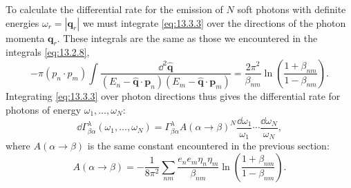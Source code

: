 To calculate the differential rate for the emission of $N$ soft photons with
definite energies $\omega_r=|\mathbf q_r|$ we must integrate
\eqref{eq:13.3.3} over the directions of the photon momenta $\mathbf q_r$.
These integrals are the same as those we encountered in the integrals
\eqref{eq:13.2.8},
\begin{equation}
-\pi(p_n\cdot p_m)\int
\frac{\dd^2\hat{\mathbf q}}
{(E_n-\hat{\mathbf q}\cdot\mathbf p_n)
 (E_m-\hat{\mathbf q}\cdot\mathbf p_m)}
=\frac{2\pi^2}{\beta_{nm}}
\ln\left(\frac{1+\beta_{nm}}{1-\beta_{nm}}\right).
\tag{13.3.4}\label{eq:13.3.4}
\end{equation}
Integrating \eqref{eq:13.3.3} over photon directions thus gives the
differential rate for photons of energy $\omega_1,\ldots,\omega_N$:
\begin{equation}
\dd\Gamma^\lambda_{\beta\alpha}(\omega_1,\ldots,\omega_N)
=\Gamma^\lambda_{\beta\alpha}A(\alpha\to\beta)^N
\frac{\dd\omega_1}{\omega_1}\cdots\frac{\dd\omega_N}{\omega_N},
\tag{13.3.5}\label{eq:13.3.5}
\end{equation}
where $A(\alpha\to\beta)$ is the same constant encountered in the previous
section:
\[
A(\alpha\to\beta)=-\frac{1}{8\pi^2}\sum_{nm}
\frac{e_ne_m\eta_n\eta_m}{\beta_{nm}}
\ln\left(\frac{1+\beta_{nm}}{1-\beta_{nm}}\right).
\]

